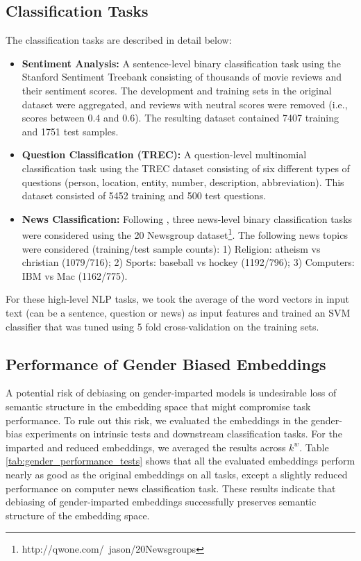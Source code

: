 \documentclass[11pt,a4paper]{article}
\begin{document}
 
 
 
 
 
 

\subsection{Classification Tasks}
\label{app:clf_tasks}

The classification tasks are described in detail below:
\begin{itemize}
    \item \textbf{Sentiment Analysis:} A sentence-level binary classification task using the Stanford Sentiment Treebank consisting of thousands of movie reviews \citep{socher13treebank} and their sentiment scores. The development and training sets in the original dataset were aggregated, and reviews with neutral scores were removed (i.e., scores between 0.4 and 0.6). The resulting dataset contained 7407 training and 1751 test samples.
    
    \item \textbf{Question Classification (TREC):} A question-level multinomial classification task using the TREC dataset \citep{li06learning} consisting of six different types of questions (person, location, entity, number, description, abbreviation). This dataset consisted of 5452 training and 500 test questions.
    
    \item \textbf{News Classification:} Following \citep{faruqui15sparse}, three news-level binary classification tasks were considered using the 20 Newsgroup dataset\footnote{http://qwone.com/~jason/20Newsgroups}. The following news topics were considered (training/test sample counts): 1) Religion: atheism vs christian (1079/716); 2) Sports: baseball vs hockey (1192/796); 3) Computers: IBM vs Mac (1162/775).
\end{itemize}

For these high-level NLP tasks, we took the average of the word vectors in input text (can be a sentence, question or news) as input features and trained an SVM classifier that was tuned using 5 fold cross-validation on the training sets. 






\subsection{Performance of Gender Biased Embeddings}

A potential risk of debiasing on gender-imparted models is undesirable loss of semantic structure in the embedding space that might compromise task performance. To rule out this risk, we evaluated the embeddings in the gender-bias experiments on intrinsic tests and downstream classification tasks. For the imparted and reduced embeddings, we averaged the results across $k^w$. Table \ref{tab:gender_performance_tests} shows that all the evaluated embeddings perform nearly as good as the original embeddings on all tasks, except a slightly reduced performance on computer news classification task. These results indicate that debiasing of gender-imparted embeddings successfully preserves semantic structure of the embedding space.
\end{document}
